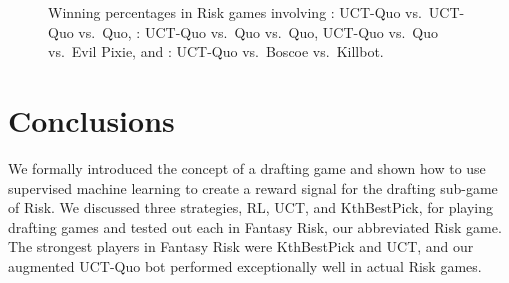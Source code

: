 \documentclass[letterpaper]{article}
\numberwithin{equation}{section}
\numberwithin{theorem}{section}
\numberwithin{lemma}{section}
\numberwithin{df}{section}
\begin{document}
\begin{figure}[t]
{\label{fig:UCTvsQUOvsEP}
}\hspace{5pt}
\caption[]{Winning percentages in Risk games involving : UCT-Quo vs.~UCT-Quo vs.~Quo, : UCT-Quo vs.~Quo vs.~Quo,   UCT-Quo vs.~Quo vs.~Evil Pixie, and : UCT-Quo vs.~Boscoe vs.~Killbot.}
\label{fig:ActualRisk}
\end{figure}


\section{Conclusions}


We formally introduced the concept of a drafting game and shown how to use supervised machine learning to create a reward signal for the drafting sub-game of Risk.  We discussed three strategies, RL, UCT, and KthBestPick, for playing drafting games and tested out each in Fantasy Risk, our abbreviated Risk game.  The strongest players in Fantasy Risk were KthBestPick and UCT, and our augmented UCT-Quo bot performed exceptionally well in actual Risk games.

\end{document}
